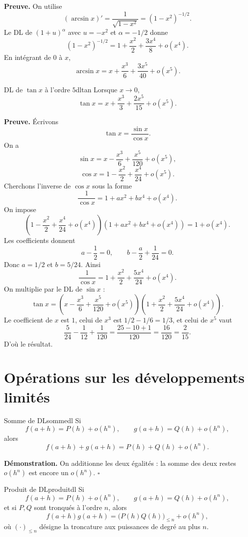 \documentclass[11pt,a4paper]{article}
\begin{document}
\textbf{Preuve.} On utilise
\[
  (\arcsin x)'=\frac1{\sqrt{1-x^2}}=(1-x^2)^{-1/2}.
\]
Le DL de $(1+u)^\alpha$ avec $u=-x^2$ et $\alpha=-1/2$ donne
\[
  (1-x^2)^{-1/2}=1+\frac{x^2}{2}+\frac{3x^4}{8}+o(x^4).
\]
En intégrant de $0$ à $x$,
\[
  \arcsin x=x+\frac{x^3}{6}+\frac{3x^5}{40}+o(x^5).
\]

\begin{examplebox}{DL de $\tan x$ à l'ordre $5$}{dltan}
Lorsque $x\to0$,
\[
  \tan x=x+\frac{x^3}{3}+\frac{2x^5}{15}+o(x^5).
\]
\end{examplebox}

\textbf{Preuve.} Écrivons
\[
  \tan x=\frac{\sin x}{\cos x}.
\]
On a
\[
  \sin x=x-\frac{x^3}{6}+\frac{x^5}{120}+o(x^5),
\]
\[
  \cos x=1-\frac{x^2}{2}+\frac{x^4}{24}+o(x^5).
\]
Cherchons l'inverse de $\cos x$ sous la forme
\[
  \frac1{\cos x}=1+ax^2+bx^4+o(x^4).
\]
On impose
\[
  \left(1-\frac{x^2}{2}+\frac{x^4}{24}+o(x^4)\right)(1+ax^2+bx^4+o(x^4))=1+o(x^4).
\]
Les coefficients donnent
\[
  a-\frac12=0,
  \qquad
  b-\frac a2+\frac1{24}=0.
\]
Donc $a=1/2$ et $b=5/24$. Ainsi
\[
  \frac1{\cos x}=1+\frac{x^2}{2}+\frac{5x^4}{24}+o(x^4).
\]
On multiplie par le DL de $\sin x$ :
\[
\tan x=\left(x-\frac{x^3}{6}+\frac{x^5}{120}+o(x^5)\right)
\left(1+\frac{x^2}{2}+\frac{5x^4}{24}+o(x^4)\right).
\]
Le coefficient de $x$ est $1$, celui de $x^3$ est $1/2-1/6=1/3$, et celui de $x^5$ vaut
\[
  \frac5{24}-\frac1{12}+\frac1{120}=\frac{25-10+1}{120}=\frac{16}{120}=\frac2{15}.
\]
D'où le résultat.

\section{Opérations sur les développements limités}

\begin{propositionbox}{Somme de DL}{sommedl}
Si
\[
  f(a+h)=P(h)+o(h^n),\qquad g(a+h)=Q(h)+o(h^n),
\]
alors
\[
  f(a+h)+g(a+h)=P(h)+Q(h)+o(h^n).
\]
\end{propositionbox}

\textbf{Démonstration.} On additionne les deux égalités : la somme des deux restes $o(h^n)$ est encore un $o(h^n)$.
\hfill $\square$

\begin{propositionbox}{Produit de DL}{produitdl}
Si
\[
  f(a+h)=P(h)+o(h^n),\qquad g(a+h)=Q(h)+o(h^n),
\]
et si $P,Q$ sont tronqués à l'ordre $n$, alors
\[
  f(a+h)g(a+h)=\big(P(h)Q(h)\big)_{\le n}+o(h^n),
\]
où $(\cdot)_{\le n}$ désigne la troncature aux puissances de degré au plus $n$.
\end{propositionbox}
\end{document}
